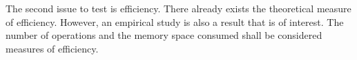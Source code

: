 The second issue to test is efficiency.  There already exists the theoretical measure of efficiency.  However, an empirical study is also a result that is of interest.  The number of operations and the memory space consumed shall be considered measures of efficiency.  













